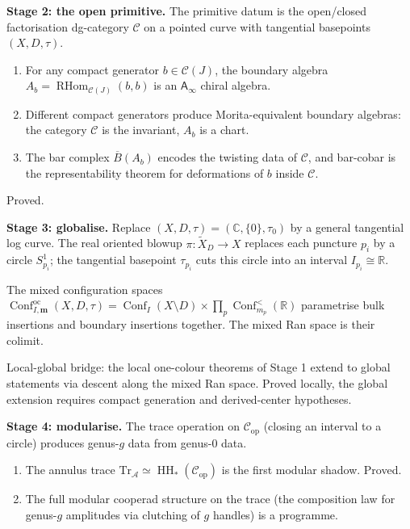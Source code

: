 \documentclass[11pt]{article}
\newcommand{\cA}{\mathcal{A}}
\newcommand{\cC}{\mathcal{C}}
\newcommand{\barB}{\overline{B}}
\newcommand{\C}{\mathbb{C}}
\newcommand{\R}{\mathbb{R}}
\newcommand{\Ainf}{\mathsf{A}_{\infty}}
\newcommand{\RHom}{\operatorname{RHom}}
\newcommand{\HH}{\operatorname{HH}}
\DeclareMathOperator{\Conf}{Conf}
\begin{document}
\medskip

\noindent
\textbf{Stage 2: the open primitive.}
The primitive datum is the open/closed factorisation dg-category
$\cC$ on a pointed curve with tangential basepoints
$(X, D, \tau)$.

\begin{enumerate}[label=\textup{(\alph*)},nosep]
\item For any compact generator $b \in \cC(J)$, the boundary
  algebra $A_b = \RHom_{\cC(J)}(b,b)$ is an $\Ainf$ chiral
  algebra.
\item Different compact generators produce Morita-equivalent
  boundary algebras: the category $\cC$ is the invariant,
  $A_b$ is a chart.
\item The bar complex $\barB(A_b)$ encodes the twisting data
  of $\cC$, and bar-cobar is the representability theorem for
  deformations of $b$ inside $\cC$.
\end{enumerate}

Proved.

\medskip

\noindent
\textbf{Stage 3: globalise.}
Replace $(X, D, \tau) = (\C, \{0\}, \tau_0)$ by a general
tangential log curve.  The real oriented blowup
$\pi\colon \widetilde{X}_D \to X$ replaces each puncture $p_i$
by a circle $S^1_{p_i}$; the tangential basepoint $\tau_{p_i}$
cuts this circle into an interval $I_{p_i} \cong \R$.

The mixed configuration spaces
$\Conf^{\mathrm{oc}}_{I,\mathbf{m}}(X, D, \tau)
= \Conf_I(X \setminus D) \times \prod_p \Conf^<_{m_p}(\R)$
parametrise bulk insertions and boundary insertions together.
The mixed Ran space is their colimit.

Local-global bridge: the local one-colour theorems of Stage 1
extend to global statements via descent along the mixed Ran space.
Proved locally, the global extension requires compact generation
and derived-center hypotheses.

\medskip

\noindent
\textbf{Stage 4: modularise.}
The trace operation on $\cC_{\mathrm{op}}$ (closing an interval
to a circle) produces genus-$g$ data from genus-$0$ data.

\begin{enumerate}[label=\textup{(\alph*)},nosep]
\item The annulus trace
  $\mathrm{Tr}_\cA \simeq \HH_*(\cC_{\mathrm{op}})$ is the
  first modular shadow.  Proved.
\item The full modular cooperad structure on the trace (the
  composition law for genus-$g$ amplitudes via clutching of $g$
  handles) is a programme.
\end{enumerate}
\end{document}
